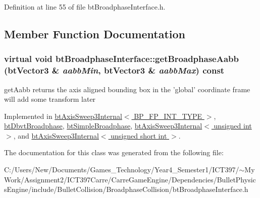 Definition at line 55 of file btBroadphaseInterface.h.

\subsection{Member Function Documentation}
\hypertarget{classbt_broadphase_interface_b5af9e26414f5a72a76040b8fab4d9e2}{
\subsubsection[getBroadphaseAabb]{\setlength{\rightskip}{0pt plus 5cm}virtual void btBroadphaseInterface::getBroadphaseAabb (btVector3 \& {\em aabbMin}, \/  btVector3 \& {\em aabbMax}) const}}
\label{classbt_broadphase_interface_b5af9e26414f5a72a76040b8fab4d9e2}


getAabb returns the axis aligned bounding box in the 'global' coordinate frame will add some transform later 

Implemented in \hyperlink{classbt_axis_sweep3_internal_5f343e29ce818d0b96cb11260bca2a68}{btAxisSweep3Internal$<$ BP\_\-FP\_\-INT\_\-TYPE $>$}, \hyperlink{structbt_dbvt_broadphase_32ab55b5ef2616d0cc039cd037c05d7f}{btDbvtBroadphase}, \hyperlink{classbt_simple_broadphase_8753363773ebbfeb48f8cf5594429dc2}{btSimpleBroadphase}, \hyperlink{classbt_axis_sweep3_internal_5f343e29ce818d0b96cb11260bca2a68}{btAxisSweep3Internal$<$ unsigned int $>$}, and \hyperlink{classbt_axis_sweep3_internal_5f343e29ce818d0b96cb11260bca2a68}{btAxisSweep3Internal$<$ unsigned short int $>$}.

The documentation for this class was generated from the following file:\begin{CompactItemize}
\item 
C:/Users/New/Documents/Games\_\-Technology/Year4\_\-Semester1/ICT397/$\sim$My Work/Assignment2/ICT397Carre/CarreGameEngine/Dependencies/BulletPhysicsEngine/include/BulletCollision/BroadphaseCollision/btBroadphaseInterface.h\end{CompactItemize}
